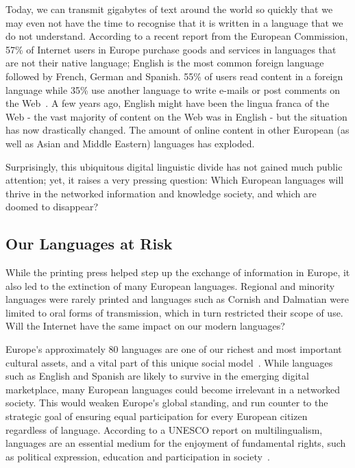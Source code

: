 \documentclass[]{../metanetpaper}
\begin{document}
\begin{multicols}{2}

Today, we can transmit gigabytes of text around the world so quickly that we may even not have the time to recognise that it is written in a language that we do not understand. According to a recent report from the European Commission, 57\% of Internet users in Europe purchase goods and services in languages that are not their native language; English is the most common foreign language followed by French, German and Spanish. 55\% of users read content in a foreign language while 35\% use another language to write e-mails or post comments on the Web~\cite{Eurobarometer313}. A few years ago, English might have been the lingua franca of the Web - the vast majority of content on the Web was in English  - but the situation has now drastically changed. The amount of online content in other European (as well as Asian and Middle Eastern) languages has exploded.


Surprisingly, this ubiquitous digital linguistic divide has not gained much public attention; yet, it raises a very pressing question: Which European languages will thrive in the networked information and knowledge society, and which are doomed to disappear?

\subsection{Our Languages at Risk}

While the printing press helped step up the exchange of information in Europe, it also led to the extinction of many European languages. Regional and minority languages were rarely printed and languages such as Cornish and Dalmatian were limited to oral forms of transmission, which in turn restricted their scope of use. Will the Internet have the same impact on our modern languages?


Europe{\mbox '}s approximately 80 languages are one of our richest and most important cultural assets, and a vital part of this unique social model~\cite{EC2}. While languages such as English and Spanish are likely to survive in the emerging digital marketplace, many European languages could become irrelevant in a networked society. This would weaken Europe{\mbox '}s global standing, and run counter to the strategic goal of ensuring equal participation for every European citizen regardless of language. According to a UNESCO report on multilingualism, languages are an essential medium for the enjoyment of fundamental rights, such as political expression, education and participation in society~\cite{UNESCO2007}.


\end{multicols}
\end{document}
